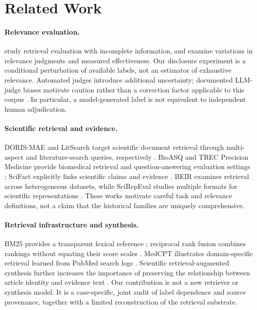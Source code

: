 \section{Related Work}
\paragraph{Relevance evaluation.}
\citet{buckley2004incomplete} study retrieval evaluation with incomplete information, and \citet{voorhees2000judgments} examine variations in relevance judgments and measured effectiveness. Our disclosure experiment is a conditional perturbation of available labels, not an estimator of exhaustive relevance. Automated judges introduce additional uncertainty; documented LLM-judge biases motivate caution rather than a correction factor applicable to this corpus \citep{zheng2023judge}. In particular, a model-generated label is not equivalent to independent human adjudication.

\paragraph{Scientific retrieval and evidence.}
DORIS-MAE and LitSearch target scientific document retrieval through multi-aspect and literature-search queries, respectively \citep{dorismae2023,litsearch2024}. BioASQ and TREC Precision Medicine provide biomedical retrieval and question-answering evaluation settings \citep{bioasq2015,trecpm2017}; SciFact explicitly links scientific claims and evidence \citep{scifact2020}. BEIR examines retrieval across heterogeneous datasets, while SciRepEval studies multiple formats for scientific representations \citep{beir2021,specter2}. These works motivate careful task and relevance definitions, not a claim that the historical \cer families are uniquely comprehensive.

\paragraph{Retrieval infrastructure and synthesis.}
BM25 provides a transparent lexical reference \citep{robertson2009}; reciprocal rank fusion combines rankings without equating their score scales \citep{rrf2009}. MedCPT illustrates domain-specific retrieval learned from PubMed search logs \citep{medcpt2023}. Scientific retrieval-augmented synthesis further increases the importance of preserving the relationship between article identity and evidence text \citep{openscholar2026}. Our contribution is not a new retriever or synthesis model. It is a case-specific, joint audit of label dependence and source provenance, together with a limited reconstruction of the retrieval substrate.

